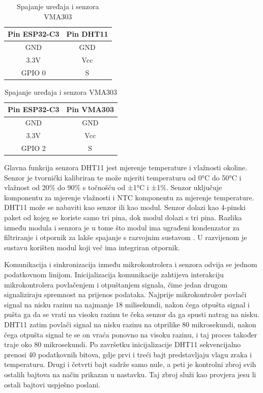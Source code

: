 \begin{table}[h]
	\centering
	\small
	\begin{minipage}{0.45\textwidth}
		\centering
		\begin{tabular}{|c|c|}
			\hline
			\rowcolor{lightblue}  
			\textbf{Pin ESP32-C3} & \textbf{Pin DHT11} \\ \hline
			GND & GND \\ \hline
			3.3V & Vcc \\ \hline
			GPIO 0 & S \\ \hline
		\end{tabular}
		\caption{Spajanje uređaja i modula DHT11}
		\label{table:pinout_dht11}
	\end{minipage}%
	\hspace{0.05\textwidth}
	\begin{minipage}{0.45\textwidth}
		\centering
		\begin{tabular}{|c|c|}
			\hline
			\rowcolor{lightblue}  
			\textbf{Pin ESP32-C3} & \textbf{Pin VMA303} \\ \hline
			GND & GND \\ \hline
			3.3V & Vcc \\ \hline
			GPIO 2 & S \\ \hline
		\end{tabular}
		\caption{Spajanje uređaja i senzora VMA303}
		\label{table:pinout_vma}
	\end{minipage}
\end{table}

Glavna funkcija senzora DHT11 jest mjerenje temperature i vlažnosti okoline. Senzor je tvornički kalibriran te može mjeriti temperaturu od 0°C do 50°C i vlažnost od 20\% do 90\% s točnošću od ±1°C i ±1\%. Senzor uključuje komponentu za mjerenje vlažnosti i NTC  komponentu za mjerenje temperature. DHT11 može se nabaviti kao senzor ili kao modul. Senzor dolazi kao 4-pinski paket od kojeg se koriste samo tri pina, dok modul dolazi s tri pina. Razlika između modula i senzora je u tome što modul ima ugrađeni kondenzator za filtriranje i otpornik za lakše spajanje s razvojnim sustavom \cite{dht11}. U razvijenom je sustavu korišten modul koji već ima integriran otpornik. 

Komunikacija i sinkronizacija između mikrokontrolera i senzora odvija se jednom podatkovnom linijom. Inicijalizacija komunikacije zahtijeva interakciju mikrokontrolera povlačenjem i otpuštanjem signala, čime jedan drugom signaliziraju spremnost na prijenos podataka. Najprije mikrokontroler povlači signal na nisku razinu na najmanje 18 milisekundi, nakon čega otpušta signal i pušta ga da se vrati na visoku razinu te čeka senzor da ga spusti natrag na nisku. DHT11 zatim povlači signal na nisku razinu na otprilike 80 mikrosekundi, nakon čega otpušta signal te se on vraća ponovno na visoku razinu, i taj proces također traje oko 80 mikrosekundi. Po završetku inicijalizacije DHT11 sekvencijalno prenosi 40 podatkovnih bitova, gdje prvi i treći bajt predstavljaju vlagu zraka i temperaturu. Drugi i četvrti bajt sadrže samo nule, a peti je kontrolni zbroj  svih ostalih bajtova na način prikazan u nastavku. Taj zbroj služi kao provjera jesu li ostali bajtovi uspješno poslani. 

